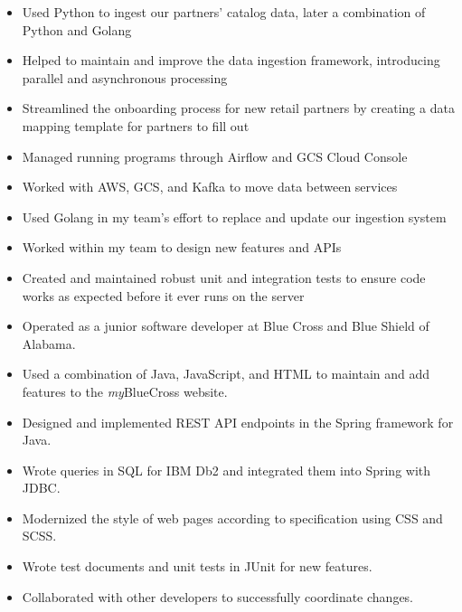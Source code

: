 \documentclass[10pt]{setzerresume}
\begin{document}
  \begin{itemize}[nosep]
    \item Used Python to ingest our partners' catalog data, later a combination of Python and Golang
    \item Helped to maintain and improve the data ingestion framework, introducing parallel and asynchronous processing
    \item Streamlined the onboarding process for new retail partners by creating a data mapping template for partners to fill out
    \item Managed running programs through Airflow and GCS Cloud Console
    \item Worked with AWS, GCS, and Kafka to move data between services
    \item Used Golang in my team's effort to replace and update our ingestion system
    \item Worked within my team to design new features and APIs
    \item Created and maintained robust unit and integration tests to ensure code works as expected before it ever runs on the server
  \end{itemize}


  \begin{itemize}[nosep]
    \item Operated as a junior software developer at Blue Cross and Blue Shield of Alabama.
    \item Used a combination of Java, JavaScript, and HTML to maintain and add features to the \textit{my}BlueCross website.
    \item Designed and implemented REST API endpoints in the Spring framework for Java.
    \item Wrote queries in SQL for IBM Db2 and integrated them into Spring with JDBC. %
    \item Modernized the style of web pages according to specification using CSS and SCSS. %
    \item Wrote test documents and unit tests in JUnit for new features.
    \item Collaborated with other developers to successfully coordinate changes.
  \end{itemize}


\end{document}
